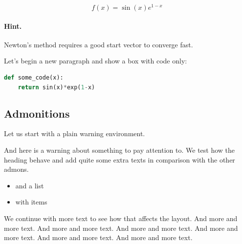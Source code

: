 \documentclass[%
oneside,                 %
final,                   %
10pt]{article}
\newenvironment{warningshaded}
{\def\FrameCommand{\fboxsep=3mm\colorbox{yellowicon_warning_background}}
 \MakeFramed {\advance\hsize-\width \FrameRestore}}{\endMakeFramed}
\newenvironment{warning_yellowiconadmon}[1][Warning]{
\begin{warningshaded}
\noindent
\begin{figure}
\vspace{-13pt}
\texttt{[image: latex\_figs/small\_yellow\_warning]}
\end{figure} \textbf{#1}\par
\nobreak\noindent\ignorespaces
}
{
\end{warningshaded}
}
\begin{document}
\begin{center}
\begin{Sbox}
\begin{minipage}{0.85\linewidth}
\begin{equation} f(x) = \sin(x)e^{1-x} \end{equation}
\end{minipage}
\end{Sbox}
\fbox{\TheSbox}
\end{center}

\paragraph{Hint.}
Newton's method requires a good start vector to converge fast.



Let's begin a new paragraph and show a box with code only:


\begin{center}
\begin{Sbox}
\begin{minipage}{0.85\linewidth}



\begin{lstlisting}[language=python,style=simple,xleftmargin=2mm]
def some_code(x):
    return sin(x)*exp(1-x)

\end{lstlisting}
\end{minipage}
\end{Sbox}
\fbox{\TheSbox}
\end{center}

\subsection{Admonitions}

Let us start with a plain warning environment.


\begin{warning_yellowiconadmon}[Warning]
And here is a warning about something to pay attention to. We
test how the heading behave and add quite some extra texts
in comparison with the other admons.

\begin{itemize}
  \item and a list

  \item with items
\end{itemize}

\noindent
We continue with more text to see how that affects the layout.
And more and more text.
And more and more text.
And more and more text.
And more and more text.
And more and more text.
And more and more text.
\end{warning_yellowiconadmon} %
\end{document}
